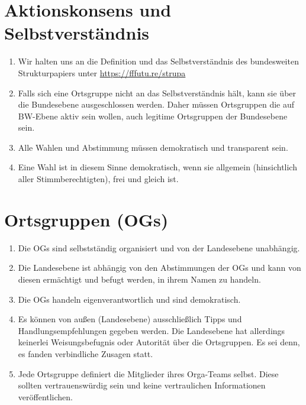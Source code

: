 \documentclass[a4paper,
  ]{scrartcl}
\begin{document}
\section{Aktionskonsens und Selbstverständnis}
\begin{enumerate}
      \item Wir halten uns an die Definition und das Selbstverständnis des bundesweiten Strukturpapiers unter \href{https://fffutu.re/strupa}{https://fffutu.re/strupa}
      \item Falls sich eine Ortsgruppe nicht an das Selbstverständnis hält, kann sie über die Bundesebene
            ausgeschlossen werden. Daher müssen Ortsgruppen die auf BW-Ebene aktiv sein wollen, auch
            legitime Ortsgruppen der Bundesebene sein.
      \item Alle Wahlen und Abstimmung müssen demokratisch und transparent sein.
      \item Eine Wahl ist in diesem Sinne demokratisch, wenn sie allgemein (hinsichtlich aller
            Stimmberechtigten), frei und gleich ist.
\end{enumerate}
\section{Ortsgruppen (OGs)}
\begin{enumerate}
      \item Die OGs sind selbstständig organisiert und von der Landesebene unabhängig.
      \item Die Landesebene ist abhängig von den Abstimmungen der OGs und kann von diesen ermächtigt und befugt werden, in ihrem Namen zu handeln.
      \item Die OGs handeln eigenverantwortlich und sind demokratisch.
      \item Es können von außen (Landesebene) ausschließlich Tipps und Handlungsempfehlungen gegeben
            werden. Die Landesebene hat allerdings keinerlei Weisungsbefugnis oder Autorität über die
            Ortsgruppen. Es sei denn, es fanden verbindliche Zusagen statt.
      \item Jede Ortsgruppe definiert die Mitglieder ihres Orga-Teams selbst. Diese sollten vertrauenswürdig
            sein und keine vertraulichen Informationen veröffentlichen.
\end{enumerate}
\end{document}
